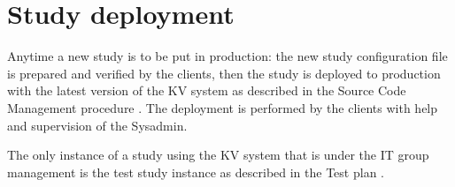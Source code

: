 \documentclass[11pt,a4paper,oneside]{article}
\begin{document}
\section{Study deployment}
Anytime a new study is to be put in production: the new study configuration file is prepared and verified by the clients, then the study is deployed to production with the latest version of the KV system as described in the Source Code Management procedure \cite{IT-1500-SCMProcedure}. The deployment is performed by the clients with help and supervision of the Sysadmin.

The only instance of a study using the KV system that is under the IT group management is the test study instance as described in the Test plan \cite{IT-0501-KV-TestPlan}.

\clearpage
\end{document}
